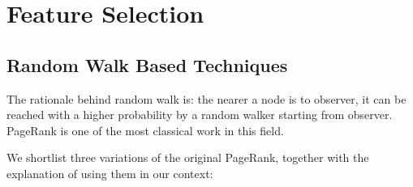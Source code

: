\documentclass[11pt,a4paper]{article}
\begin{document}
\section{Feature Selection}

\subsection{Random Walk Based Techniques}
\label{sec:prox_pr}

The rationale behind random walk is: the nearer a node
is to observer, it can be reached with a higher probability by a random 
	walker starting from observer. PageRank is one of the most classical work 
	in this field.

We shortlist three variations\cite{aggarwal2011social} of the original 
PageRank, together with the explanation of using them in our context:
\end{document}
